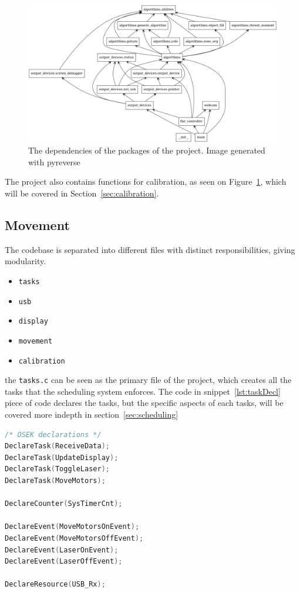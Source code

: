 \begin{figure}[H]
	\centering
	\includegraphics[width=\textwidth]{5.Solution/images/python_packages.png}
	\caption{The dependencies of the packages of the project{.} Image generated with pyreverse\cite{pyreverse}}
	\label{fig:pythonClasses}
\end{figure}


The project also contains functions for calibration, as seen on Figure~\ref{fig:pythonClasses}, which will be covered in Section~\ref{sec:calibration}.


\subsection{Movement}
The codebase is separated into different files with distinct responsibilities, giving modularity.

\begin{itemize}
	\item \texttt{tasks}
	\item \texttt{usb}
	\item \texttt{display}
	\item \texttt{movement}
	\item \texttt{calibration}
\end{itemize}

the \texttt{tasks.c} can be seen as the primary file of the project, which creates all the tasks that the scheduling system enforces.
The code in snippet~\ref{lst:taskDecl} piece of code declares the tasks, but the specific aspects of each tasks, will be covered more indepth in section~\ref{sec:scheduling}
\begin{lstlisting}[language={c},label={lst:taskDecl},caption={Declaration of tasks, counters and events}]
/* OSEK declarations */
DeclareTask(ReceiveData);
DeclareTask(UpdateDisplay);
DeclareTask(ToggleLaser);
DeclareTask(MoveMotors);

DeclareCounter(SysTimerCnt);

DeclareEvent(MoveMotorsOnEvent);
DeclareEvent(MoveMotorsOffEvent);
DeclareEvent(LaserOnEvent);
DeclareEvent(LaserOffEvent);

DeclareResource(USB_Rx);
\end{lstlisting}


